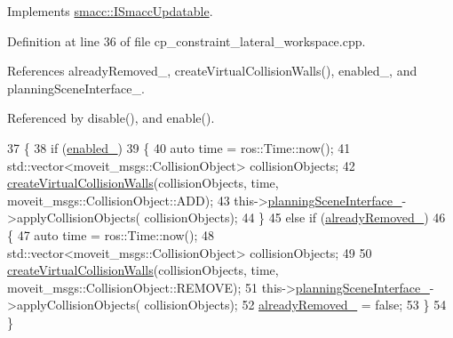 Implements \hyperlink{classsmacc_1_1ISmaccUpdatable_a84ee0520cbefdb1d412bed54650b028e}{smacc\+::\+I\+Smacc\+Updatable}.



Definition at line 36 of file cp\+\_\+constraint\+\_\+lateral\+\_\+workspace.\+cpp.



References already\+Removed\+\_\+, create\+Virtual\+Collision\+Walls(), enabled\+\_\+, and planning\+Scene\+Interface\+\_\+.



Referenced by disable(), and enable().


\begin{DoxyCode}
37         \{
38             \textcolor{keywordflow}{if} (\hyperlink{classsm__fetch__six__table__pick__n__sort__1_1_1cl__move__group__interface_1_1CpConstraintLateralWorkspace_ab8da476ed73090751dc61b38cb9426a3}{enabled\_})
39             \{
40                 \textcolor{keyword}{auto} time = ros::Time::now();
41                 std::vector<moveit\_msgs::CollisionObject> collisionObjects;
42                 \hyperlink{classsm__fetch__six__table__pick__n__sort__1_1_1cl__move__group__interface_1_1CpConstraintLateralWorkspace_a32b7f02170ebee9e56b55cb69de22ba6}{createVirtualCollisionWalls}(collisionObjects, time, 
      moveit\_msgs::CollisionObject::ADD);
43                 this->\hyperlink{classsm__fetch__six__table__pick__n__sort__1_1_1cl__move__group__interface_1_1CpConstraintLateralWorkspace_aa35cde8d74f5d015e7a6384c2bbd1a16}{planningSceneInterface\_}->applyCollisionObjects(
      collisionObjects);
44             \}
45             \textcolor{keywordflow}{else} \textcolor{keywordflow}{if} (\hyperlink{classsm__fetch__six__table__pick__n__sort__1_1_1cl__move__group__interface_1_1CpConstraintLateralWorkspace_a303f8baa5e4a7ab06033b1885d604fb4}{alreadyRemoved\_})
46             \{
47                 \textcolor{keyword}{auto} time = ros::Time::now();
48                 std::vector<moveit\_msgs::CollisionObject> collisionObjects;
49 
50                 \hyperlink{classsm__fetch__six__table__pick__n__sort__1_1_1cl__move__group__interface_1_1CpConstraintLateralWorkspace_a32b7f02170ebee9e56b55cb69de22ba6}{createVirtualCollisionWalls}(collisionObjects, time, 
      moveit\_msgs::CollisionObject::REMOVE);
51                 this->\hyperlink{classsm__fetch__six__table__pick__n__sort__1_1_1cl__move__group__interface_1_1CpConstraintLateralWorkspace_aa35cde8d74f5d015e7a6384c2bbd1a16}{planningSceneInterface\_}->applyCollisionObjects(
      collisionObjects);
52                 \hyperlink{classsm__fetch__six__table__pick__n__sort__1_1_1cl__move__group__interface_1_1CpConstraintLateralWorkspace_a303f8baa5e4a7ab06033b1885d604fb4}{alreadyRemoved\_} = \textcolor{keyword}{false};
53             \}
54         \}
\end{DoxyCode}
